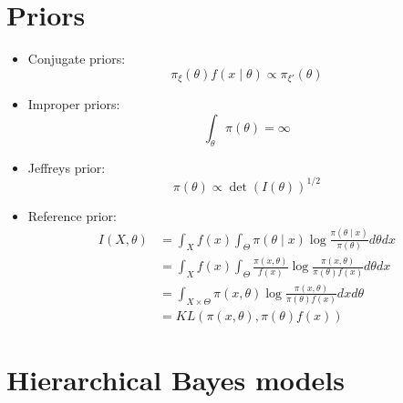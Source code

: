 \documentclass[a4paper]{article}
\begin{document}
\section*{Priors}

\begin{itemize}
    \item Conjugate priors:
    \[\pi_{\xi}(\theta)f(x\mid\theta)\propto\pi_{\xi'}(\theta) \]
    \item Improper priors:
    \[\int_{\theta}\pi(\theta)=\infty \]
    \item Jeffreys prior:
    \[\pi(\theta)\propto\det(I(\theta))^{1/2} \]
    \item Reference prior:
    \begin{align*}
        I(X,\theta)&=\int_{X}f(x)\int_{\Theta}\pi(\theta\mid x)\log\frac{\pi(\theta\mid x)}{\pi(\theta)}d\theta dx \\
        &=\int_{X}f(x)\int_{\Theta}\frac{\pi(x,\theta)}{f(x)}\log\frac{\pi(x,\theta)}{\pi(\theta)f(x)}d\theta dx \\
        &=\int_{X\times\Theta}\pi(x,\theta)\log\frac{\pi(x,\theta)}{\pi(\theta)f(x)} dx d\theta \\
        &=KL(\pi(x,\theta),\pi(\theta)f(x))
    \end{align*}
\end{itemize}

\section*{Hierarchical Bayes models}
\end{document}
